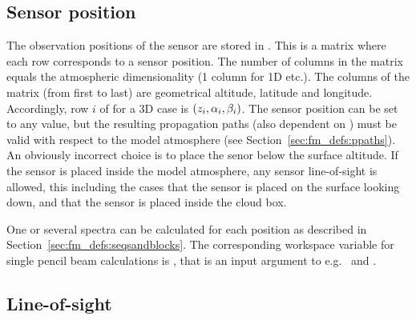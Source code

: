 \subsection{Sensor position}
\label{sec:fm_defs:sensorpos}

The observation positions of the sensor are stored in
. This is a matrix where each row corresponds to
a sensor position. The number of columns in the matrix equals the
atmospheric dimensionality (1 column for 1D etc.). The columns of the
matrix (from first to last) are geometrical altitude, latitude and longitude.
Accordingly, row $i$ of  for a 3D case is
$(z_{i},\alpha_{i},\beta_{i})$. The sensor position can be set to any
value, but the resulting propagation paths (also dependent on
) must be valid with respect to the model
atmosphere (see Section~\ref{sec:fm_defs:ppaths}). An obviously
incorrect choice is to place the senor below the surface altitude. If
the sensor is placed inside the model atmosphere, any sensor
line-of-sight is allowed, this including the cases that the sensor is
placed on the surface looking down, and that the sensor is placed
inside the cloud box. 

One or several spectra can be calculated for each position as described in
Section~\ref{sec:fm_defs:seqsandblocks}. The corresponding workspace variable
for single pencil beam calculations is , that is an input
argument to e.g.\  and .



\subsection{Line-of-sight}
\label{sec:fm_defs:los}

